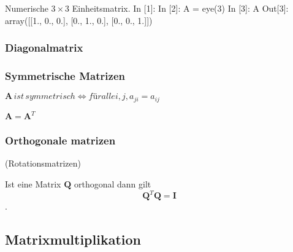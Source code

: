 \begin{python}{Numerische $3\times 3$ Einheitsmatrix.}
In [1]: %
In [2]: A = eye(3)
In [3]: A
Out[3]:
array([[1., 0., 0.],
       [0., 1., 0.],
       [0., 0., 1.]])
\end{python}


\subsubsection{Diagonalmatrix}

\subsubsection{Symmetrische Matrizen}

$\mathbf{A} \, ist \, symmetrisch \iff für alle i,j, a_{ji} = a_{ij}$

$\mathbf{A} = \mathbf{A}^T$



\subsubsection{Orthogonale matrizen}
(Rotationsmatrizen)

Ist eine Matrix $\mathbf{Q}$ orthogonal dann gilt 
$$ \mathbf{Q}^T\mathbf{Q} = \mathbf{I} $$.


\subsection*{Matrixmultiplikation}


